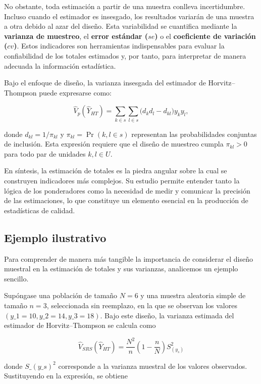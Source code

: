 \documentclass[
  12pt,
]{book}
\begin{document}
No obstante, toda estimación a partir de una muestra conlleva incertidumbre. Incluso cuando el estimador es insesgado, los resultados variarán de una muestra a otra debido al azar del diseño. Esta variabilidad se cuantifica mediante la \textbf{varianza de muestreo}, el \textbf{error estándar (\(se\))} o el \textbf{coeficiente de variación (\(cv\))}. Estos indicadores son herramientas indispensables para evaluar la confiabilidad de los totales estimados y, por tanto, para interpretar de manera adecuada la información estadística.

Bajo el enfoque de diseño, la varianza insesgada del estimador de Horvitz--Thompson puede expresarse como:

\[
\hat{V}_p(\hat{Y}_{HT}) = \sum_{k \in s} \sum_{l \in s} \bigl( d_k d_l - d_{kl} \bigr) y_k y_l,
\]

donde \(d_{kl} = 1/\pi_{kl}\) y \(\pi_{kl} = \Pr(k,l \in s)\) representan las probabilidades conjuntas de inclusión. Esta expresión requiere que el diseño de muestreo cumpla \(\pi_{kl} > 0\) para todo par de unidades \(k,l \in U\).

En síntesis, la estimación de totales es la piedra angular sobre la cual se construyen indicadores más complejos. Su estudio permite entender tanto la lógica de los ponderadores como la necesidad de medir y comunicar la precisión de las estimaciones, lo que constituye un elemento esencial en la producción de estadísticas de calidad.

\subsection{Ejemplo ilustrativo}\label{ejemplo-ilustrativo-1}

Para comprender de manera más tangible la importancia de considerar el diseño muestral en la estimación de totales y sus varianzas, analicemos un ejemplo sencillo.

Supóngase una población de tamaño \(N=6\) y una muestra aleatoria simple de tamaño \(n=3\), seleccionada sin reemplazo, en la que se observan los valores \((y\_1=10, y\_2=14, y\_3=18)\). Bajo este diseño, la varianza estimada del estimador de Horvitz--Thompson se calcula como

\[
\hat{V}_{SRS}(\hat{Y}_{HT}) = \frac{N^2}{n}\left(1-\frac{n}{N}\right)S_{(y_s)}^2 \tag{9-5}
\]

donde \(S\_{(y\_s)}^2\) corresponde a la varianza muestral de los valores observados. Sustituyendo en la expresión, se obtiene
\end{document}
